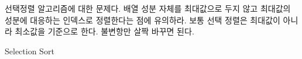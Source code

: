 \documentclass[a4paper,chapter,atbegshi]{oblivoir}
\begin{document}
선택정렬 알고리즘에 대한 문제다. 배열 성분 자체를 최대값으로 두지 않고
최대값의 성분에 대응하는 인덱스로 정렬한다는 점에 유의하라. 보통 선택
정렬은 최대값이 아니라 최소값을 기준으로 한다. 불변항만 살짝 바꾸면 된다.
\begin{algorithm}
  \caption{Selection Sort}
\end{algorithm}
\end{document}
